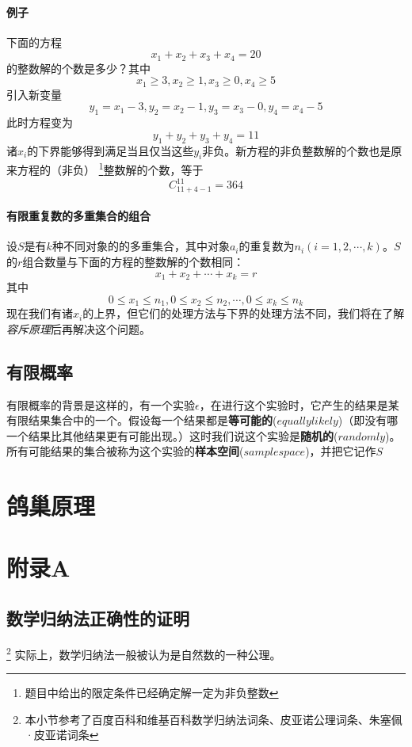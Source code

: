 \documentclass{ctexart}
\begin{document}
     \paragraph{例子}下面的方程
     \[x_1 + x_2 + x_3 + x_4 = 20\]
     的整数解的个数是多少？其中
     \[x_ 1 \geqslant 3 , x_2 \geqslant 1 ,x_3 \geqslant 0 ,x_4 \geqslant 5\]
     引入新变量
     \[y_1 = x_1 -3 , y_2 = x_2 - 1 , y_3 = x _3 - 0 ,y_4 = x_4 -5\]
     此时方程变为
     \[y_1 + y_2 + y_3 + y_4 = 11\]
     诸$x_i$的下界能够得到满足当且仅当这些$y_i$非负。新方程的非负整数解的个数也是原来方程的（非负）
     \footnote{题目中给出的限定条件已经确定解一定为非负整数}整数解的个数，等于
     \[C_{11+4-1}^{11} = 364\]
     \paragraph{有限重复数的多重集合的组合}
     设$S$是有$k$种不同对象的的多重集合，其中对象$a_i$的重复数为$n_i(i = 1,2,\cdots,k)$。$S$的$r$组合数量与下面的方程的整数解的个数相同：
     \[x_1 + x_2 + \cdots + x_k = r\]
     其中
     \[0 \leqslant x_1 \leqslant n_1 , 0 \leqslant x_2 \leqslant n_2,\cdots , 0 \leqslant x_k \leqslant n_k\]
     现在我们有诸$x_i$的上界，但它们的处理方法与下界的处理方法不同，我们将在了解\textit{容斥原理}后再解决这个问题。
   \subsection{有限概率}
   有限概率的背景是这样的，有一个实验$\epsilon$，在进行这个实验时，它产生的结果是某有限结果集合中的一个。假设每一个结果都是\textbf{等可能的}($equally likely$)（即没有哪一个结果比其他结果更有可能出现。）这时我们说这个实验是\textbf{随机的}($randomly$)。所有可能结果的集合被称为这个实验的\textbf{样本空间}($sample space$)，并把它记作$S$
   \section{鸽巢原理}
   \section{附录A}
    \subsection{数学归纳法正确性的证明}
    \footnote{本小节参考了百度百科和维基百科数学归纳法词条、皮亚诺公理词条、朱塞佩·皮亚诺词条}
    实际上，数学归纳法一般被认为是自然数的一种公理。
\end{document}
